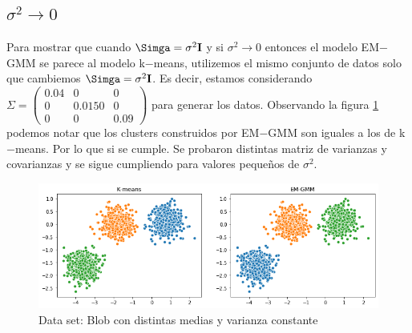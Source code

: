 \documentclass[paper=letter, fontsize=11pt]{scrartcl}
\numberwithin{equation}{section} %
\numberwithin{figure}{section} %
\numberwithin{table}{section} %
\begin{document}
\subsection{$\sigma^2\rightarrow 0$}
Para mostrar que cuando $\Simga = \sigma^2\bf I$  y si $\sigma^2\rightarrow 0$ entonces el modelo EM$-$GMM se parece al modelo k$-$means, utilizemos el mismo conjunto de datos solo que cambiemos $\Simga = \sigma^2\bf I$. Es decir, estamos considerando $\Sigma= \begin{pmatrix} 
0.04& 0 & 0\\ 0& 0.0150 & 0 \\ 0 & 0 & 0.09 \end{pmatrix}$ para generar los datos. Observando la figura \ref{fig:em_gmm_var} podemos notar que los clusters construidos por EM$-$GMM son iguales a los de k$-$means. Por lo que si se cumple. Se probaron distintas matriz de varianzas y covarianzas y se sigue cumpliendo para valores pequeños de $\sigma^2.$
\begin{figure}[H]
    \centering
    \includegraphics[scale=0.7]{figure/em_gmm_var.png}
    \caption{Data set: Blob con distintas medias y varianza constante}
    \label{fig:em_gmm_var}
\end{figure}
\end{document}
